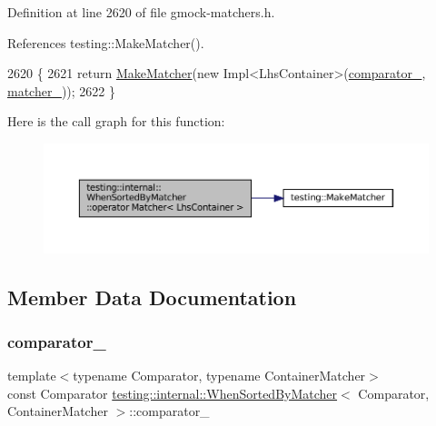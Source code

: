 Definition at line 2620 of file gmock-\/matchers.\+h.



References testing\+::\+Make\+Matcher().


\begin{DoxyCode}
2620                                          \{
2621     \textcolor{keywordflow}{return} \hyperlink{namespacetesting_a37fd8029ac00e60952440a3d9cca8166}{MakeMatcher}(\textcolor{keyword}{new} Impl<LhsContainer>(\hyperlink{classtesting_1_1internal_1_1WhenSortedByMatcher_adea7dca9b0e3b5d2ab198cc9c29b1c2d}{comparator\_}, 
      \hyperlink{classtesting_1_1internal_1_1WhenSortedByMatcher_ab873ba633a5f7dfc46440e8f2c9d5611}{matcher\_}));
2622   \}
\end{DoxyCode}
Here is the call graph for this function\+:
\nopagebreak
\begin{figure}[H]
\begin{center}
\leavevmode
\includegraphics[width=350pt]{classtesting_1_1internal_1_1WhenSortedByMatcher_ae76285fee36055ffde63492102d3c67f_cgraph}
\end{center}
\end{figure}


\subsection{Member Data Documentation}
\mbox{\label{classtesting_1_1internal_1_1WhenSortedByMatcher_adea7dca9b0e3b5d2ab198cc9c29b1c2d}} 
\subsubsection{\texorpdfstring{comparator\+\_\+}{comparator\_}}
{\footnotesize\ttfamily template$<$typename Comparator, typename Container\+Matcher$>$ \\
const Comparator \hyperlink{classtesting_1_1internal_1_1WhenSortedByMatcher}{testing\+::internal\+::\+When\+Sorted\+By\+Matcher}$<$ Comparator, Container\+Matcher $>$\+::comparator\+\_\+\hspace{0.3cm}{\ttfamily [private]}}



